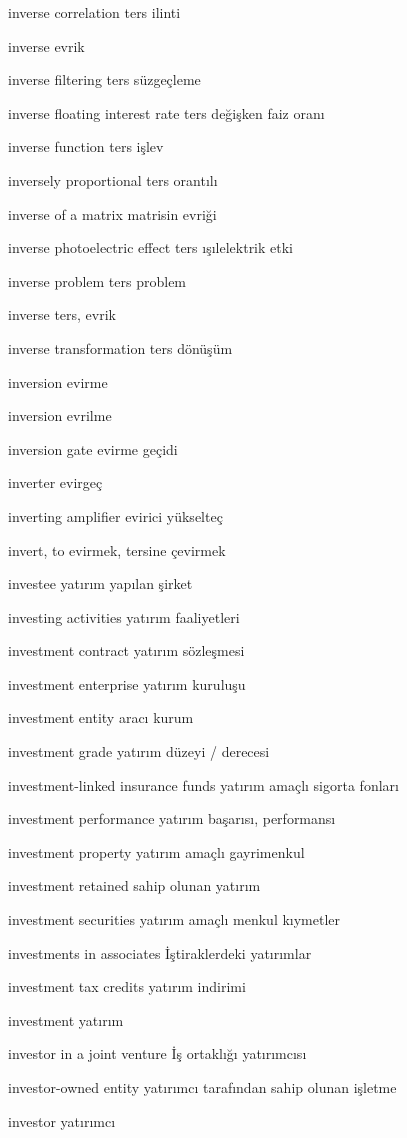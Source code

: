 \documentclass[12pt,fleqn]{article}\usepackage{../../common}
\begin{document}
inverse correlation ters ilinti

inverse evrik

inverse filtering ters süzgeçleme

inverse floating interest rate ters değişken faiz oranı

inverse function ters işlev

inversely proportional ters orantılı

inverse of a matrix matrisin evriği

inverse photoelectric effect ters ışılelektrik etki

inverse problem ters problem

inverse ters, evrik

inverse transformation ters dönüşüm

inversion evirme

inversion evrilme

inversion gate evirme geçidi

inverter evirgeç

inverting amplifier evirici yükselteç

invert, to evirmek, tersine çevirmek

investee yatırım yapılan şirket

investing activities yatırım faaliyetleri

investment contract yatırım sözleşmesi

investment enterprise yatırım kuruluşu

investment entity aracı kurum

investment grade yatırım düzeyi / derecesi

investment-linked insurance funds yatırım amaçlı sigorta fonları

investment performance yatırım başarısı, performansı

investment property yatırım amaçlı gayrimenkul

investment retained sahip olunan yatırım

investment securities yatırım amaçlı menkul kıymetler

investments in associates İştiraklerdeki yatırımlar

investment tax credits yatırım indirimi

investment yatırım

investor in a joint venture İş ortaklığı yatırımcısı

investor-owned entity yatırımcı tarafından sahip olunan işletme

investor yatırımcı
\end{document}

